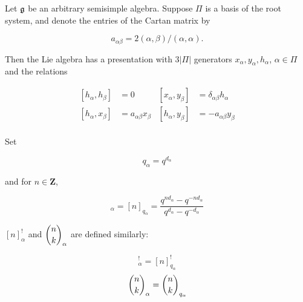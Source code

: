 
    Let $\mathfrak{g}$ be an arbitrary semisimple algebra. Suppose $\Pi$ is
    a basis of the root system, and denote the entries of the Cartan matrix
    by 

    \begin{equation}
        a_{\alpha\beta} = 2(\alpha, \beta) / (\alpha, \alpha).
    \end{equation}

    Then the Lie algebra has a presentation with $3|\Pi|$ generators
    $x_\alpha, y_\alpha, h_\alpha$, $\alpha \in \Pi$ and the relations 

    \begin{align}
        \left[ h_\alpha, h_\beta \right] &= 0       &   \left[ x_\alpha, y_\beta \right] &= \delta_{\alpha\beta} h_\alpha \\
        \left[ h_\alpha, x_\beta \right] &= a_{\alpha\beta} x_\beta  &   \left[ h_\alpha, y_\beta \right] &= -a_{\alpha\beta} y_\beta \\
    \end{align}

    Set

    \begin{equation}
        q_\alpha = q^{d_\alpha}
    \end{equation}

    and for $n \in \mathbf{Z}$,

    \begin{equation}
        [n]_\alpha = [n]_{q_\alpha} = \frac{q^{nd_\alpha} - q^{-nd_\alpha}}{q^{d_\alpha} - q^{-d_\alpha}}
    \end{equation}

    $[n]_\alpha^!$ and $\dbinom{n}{k}_\alpha$ are defined similarly: 
    
    \begin{equation}
        [n]_\alpha^! = [n]_{q_{\alpha}}^!
    \end{equation}
    \begin{equation}
        \dbinom{n}{k}_\alpha = \dbinom{n}{k}_{q_\alpha}
    \end{equation}


